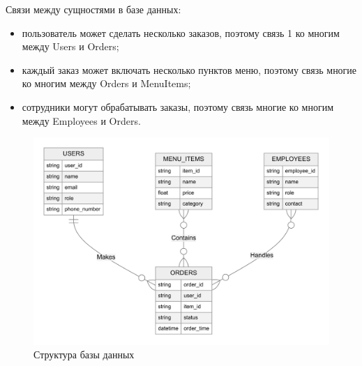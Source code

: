 {{        Связи между сущностями в базе данных:
        \begin{itemize}
            \item пользователь может сделать несколько заказов, поэтому связь 1 ко многим между Users и Orders;
            \item каждый заказ может включать несколько пунктов меню, поэтому связь многие ко многим между Orders и MenuItems;
            \item сотрудники могут обрабатывать заказы, поэтому связь многие ко многим между Employees и Orders.
        \end{itemize} 

        
        \begin{figure}[H]
            \centering
            \includegraphics[width=1\textwidth]{assets/database.png} 
            \caption{Структура базы данных}
        \end{figure}
    }

}
